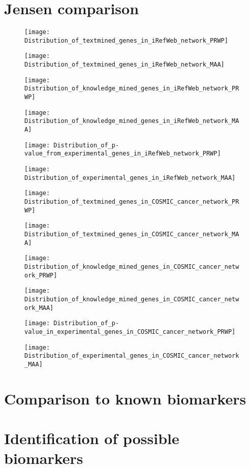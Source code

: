 \section{Jensen comparison}
\begin{figure}
    \label{fig:txt-irefweb-prwp}
    \texttt{[image: Distribution\_of\_textmined\_genes\_in\_iRefWeb\_network\_PRWP]}
\end{figure}
\begin{figure}
    \label{fig:txt-irefweb-maa}
    \texttt{[image: Distribution\_of\_textmined\_genes\_in\_iRefWeb\_network\_MAA]}
\end{figure}
\begin{figure}
    \label{fig:know-irefweb-prwp}
    \texttt{[image: Distribution\_of\_knowledge\_mined\_genes\_in\_iRefWeb\_network\_PRWP]}
\end{figure}
\begin{figure}
    \label{fig:know-irefweb-maa}
    \texttt{[image: Distribution\_of\_knowledge\_mined\_genes\_in\_iRefWeb\_network\_MAA]}
\end{figure}
\begin{figure}
    \label{fig:exp-irefweb-prwp}
    \texttt{[image: Distribution\_of\_p-value\_from\_experimental\_genes\_in\_iRefWeb\_network\_PRWP]}
\end{figure}
\begin{figure}
    \label{fig:exp-irefweb-maa}
    \texttt{[image: Distribution\_of\_experimental\_genes\_in\_iRefWeb\_network\_MAA]}
\end{figure}
\begin{figure}
    \label{fig:txt-cosmic-prwp}
    \texttt{[image: Distribution\_of\_textmined\_genes\_in\_COSMIC\_cancer\_network\_PRWP]}
\end{figure}
\begin{figure}
    \label{fig:txt-cosmic-maa}
    \texttt{[image: Distribution\_of\_textmined\_genes\_in\_COSMIC\_cancer\_network\_MAA]}
\end{figure}
\begin{figure}
    \label{fig:know-cosmic-prwp}
    \texttt{[image: Distribution\_of\_knowledge\_mined\_genes\_in\_COSMIC\_cancer\_network\_PRWP]}
\end{figure}
\begin{figure}
    \label{fig:know-cosmic-maa}
    \texttt{[image: Distribution\_of\_knowledge\_mined\_genes\_in\_COSMIC\_cancer\_network\_MAA]}
\end{figure}
\begin{figure}
    \label{fig:exp-cosmic-prwp}
    \texttt{[image: Distribution\_of\_p-value\_in\_experimental\_genes\_in\_COSMIC\_cancer\_network\_PRWP]}
\end{figure}
\begin{figure}
    \label{fig:exp-cosmic-maa}
    \texttt{[image: Distribution\_of\_experimental\_genes\_in\_COSMIC\_cancer\_network\_MAA]}
\end{figure}

\section{Comparison to known biomarkers}
\section{Identification of possible biomarkers}
